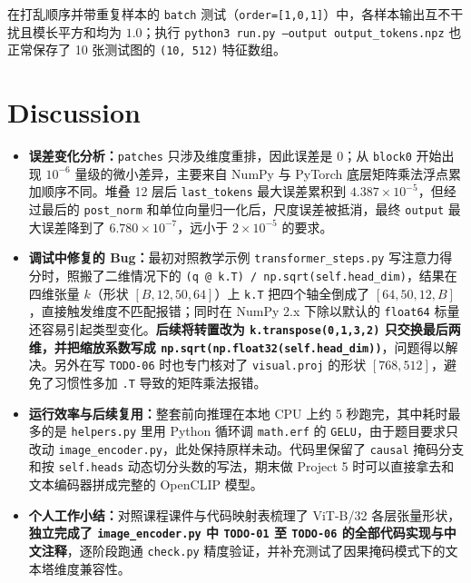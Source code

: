 \documentclass[a4paper,11pt]{article}
\newcommand{\mywork}[1]{\textcolor{myred}{\textbf{#1}}}
\begin{document}
在打乱顺序并带重复样本的 \texttt{batch} 测试（\texttt{order=[1,0,1]}）中，各样本输出互不干扰且模长平方和均为 $1.0$；执行 \texttt{python3 run.py --output output\_tokens.npz} 也正常保存了 10 张测试图的 \texttt{(10, 512)} 特征数组。

\section{Discussion}

\begin{itemize}
    \item \textbf{误差变化分析：}\texttt{patches} 只涉及维度重排，因此误差是 0；从 \texttt{block0} 开始出现 $10^{-6}$ 量级的微小差异，主要来自 NumPy 与 PyTorch 底层矩阵乘法浮点累加顺序不同。堆叠 12 层后 \texttt{last\_tokens} 最大误差累积到 $4.387\times 10^{-5}$，但经过最后的 \texttt{post\_norm} 和单位向量归一化后，尺度误差被抵消，最终 \texttt{output} 最大误差降到了 $6.780\times 10^{-7}$，远小于 $2\times 10^{-5}$ 的要求。
    \item \mywork{调试中修复的 Bug：}最初对照教学示例 \texttt{transformer\_steps.py} 写注意力得分时，照搬了二维情况下的 \texttt{(q @ k.T) / np.sqrt(self.head\_dim)}，结果在四维张量 $k$（形状 $[B,12,50,64]$）上 \texttt{k.T} 把四个轴全倒成了 $[64,50,12,B]$，直接触发维度不匹配报错；同时在 NumPy 2.x 下除以默认的 \texttt{float64} 标量还容易引起类型变化。\mywork{后续将转置改为 \texttt{k.transpose(0,1,3,2)} 只交换最后两维，并把缩放系数写成 \texttt{np.sqrt(np.float32(self.head\_dim))}}，问题得以解决。另外在写 \texttt{TODO-06} 时也专门核对了 \texttt{visual.proj} 的形状 $[768,512]$，避免了习惯性多加 \texttt{.T} 导致的矩阵乘法报错。
    \item \textbf{运行效率与后续复用：}整套前向推理在本地 CPU 上约 5 秒跑完，其中耗时最多的是 \texttt{helpers.py} 里用 Python 循环调 \texttt{math.erf} 的 \texttt{GELU}，由于题目要求只改动 \texttt{image\_encoder.py}，此处保持原样未动。代码里保留了 \texttt{causal} 掩码分支和按 \texttt{self.heads} 动态切分头数的写法，期末做 Project 5 时可以直接拿去和文本编码器拼成完整的 OpenCLIP 模型。
    \item \mywork{个人工作小结：}对照课程课件与代码映射表梳理了 ViT-B/32 各层张量形状，\mywork{独立完成了 \texttt{image\_encoder.py} 中 \texttt{TODO-01} 至 \texttt{TODO-06} 的全部代码实现与中文注释}，逐阶段跑通 \texttt{check.py} 精度验证，并补充测试了因果掩码模式下的文本塔维度兼容性。
\end{itemize}

\restoregeometry

\end{document}
